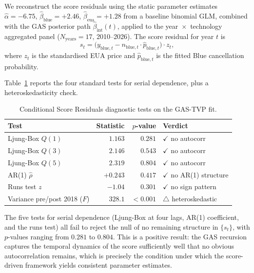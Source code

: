 \documentclass[11pt,a4paper]{article}
\begin{document}
We reconstruct the score residuals using the static parameter estimates $\hat\alpha = -6.75$, $\hat\beta_{\mathrm{blue}} = +2.46$, $\hat\beta_{\mathrm{eua}} = +1.28$ from a baseline binomial GLM, combined with the GAS posterior path $\hat\beta_{\mathrm{int}}(t)$, applied to the year~$\times$~technology aggregated panel ($N_{\mathrm{years}} = 17$, 2010--2026). The score residual for year $t$ is
$$
s_t = \big(y_{\mathrm{blue},t} - n_{\mathrm{blue},t} \cdot \hat{p}_{\mathrm{blue},t}\big) \cdot z_t,
$$
where $z_t$ is the standardised EUA price and $\hat{p}_{\mathrm{blue},t}$ is the fitted Blue cancellation probability.

Table~\ref{tab:ch7-csr} reports the four standard tests for serial dependence, plus a heteroskedasticity check.

\begin{table}[ht]
\centering
\caption{Conditional Score Residuals diagnostic tests on the GAS-TVP fit.}
\label{tab:ch7-csr}
\begin{tabular}{lrrl}
\toprule
Test & Statistic & $p$-value & Verdict \\
\midrule
Ljung-Box $Q(1)$         & $1.163$ & $0.281$ & $\checkmark$ no autocorr \\
Ljung-Box $Q(3)$         & $2.146$ & $0.543$ & $\checkmark$ no autocorr \\
Ljung-Box $Q(5)$         & $2.319$ & $0.804$ & $\checkmark$ no autocorr \\
AR(1) $\hat\rho$         & $+0.243$ & $0.417$ & $\checkmark$ no AR(1) structure \\
Runs test $z$            & $-1.04$ & $0.301$ & $\checkmark$ no sign pattern \\
Variance pre/post 2018 ($F$) & $328.1$ & $<0.001$ & $\triangle$ heteroskedastic \\
\bottomrule
\end{tabular}
\end{table}

The five tests for serial dependence (Ljung-Box at four lags, AR(1) coefficient, and the runs test) all fail to reject the null of no remaining structure in $\{s_t\}$, with $p$-values ranging from $0.281$ to $0.804$. This is a positive result: the GAS recursion captures the temporal dynamics of the score sufficiently well that no obvious autocorrelation remains, which is precisely the condition under which the \citet{creal2013generalized} score-driven framework yields consistent parameter estimates.
\end{document}
